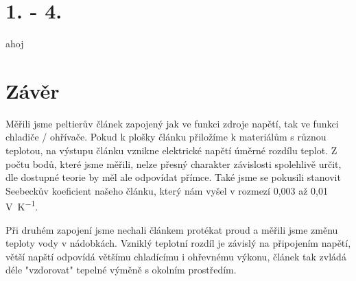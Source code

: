 \documentclass{protokol}
\begin{document}

%		
%		
%		
%		

\section{1. - 4.}

	ahoj
	

		
\section{Závěr}
	Měřili jsme peltierův článek zapojený jak ve funkci zdroje napětí, tak ve funkci chladiče / ohřívače. Pokud k plošky článku přiložíme k materiálům s různou teplotou, na výstupu článku vznikne elektrické napětí úměrné rozdílu teplot. Z počtu bodů, které jsme měřili, nelze přesný charakter závislosti spolehlivě určit, dle dostupné teorie by měl ale odpovídat přímce. Také jsme se pokusili stanovit Seebeckův koeficient našeho článku, který nám vyšel v rozmezí 0,003 až 0,01 \unit{\volt\per\kelvin}.
	
	Při druhém zapojení jsme nechali článkem protékat proud a měřili jsme změnu teploty vody v nádobkách. Vzniklý teplotní rozdíl je závislý na připojením napětí, větší napští odpovídá většímu chladícímu i ohřevnému výkonu, článek tak zvládá déle "vzdorovat" tepelné výměně s okolním prostředím.
\end{document}
